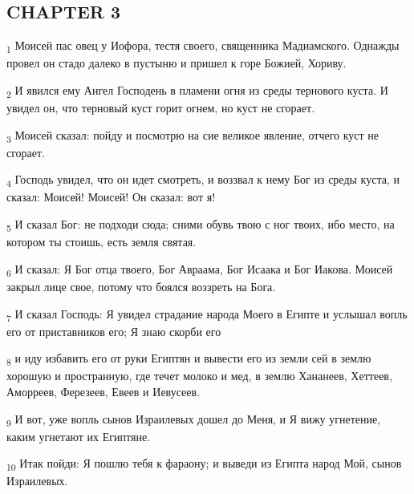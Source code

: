 \subsection{CHAPTER 3}
\begin{tcolorbox}
\textsubscript{1} Моисей пас овец у Иофора, тестя своего, священника Мадиамского. Однажды провел он стадо далеко в пустыню и пришел к горе Божией, Хориву.
\end{tcolorbox}
\begin{tcolorbox}
\textsubscript{2} И явился ему Ангел Господень в пламени огня из среды тернового куста. И увидел он, что терновый куст горит огнем, но куст не сгорает.
\end{tcolorbox}
\begin{tcolorbox}
\textsubscript{3} Моисей сказал: пойду и посмотрю на сие великое явление, отчего куст не сгорает.
\end{tcolorbox}
\begin{tcolorbox}
\textsubscript{4} Господь увидел, что он идет смотреть, и воззвал к нему Бог из среды куста, и сказал: Моисей! Моисей! Он сказал: вот я!
\end{tcolorbox}
\begin{tcolorbox}
\textsubscript{5} И сказал Бог: не подходи сюда; сними обувь твою с ног твоих, ибо место, на котором ты стоишь, есть земля святая.
\end{tcolorbox}
\begin{tcolorbox}
\textsubscript{6} И сказал: Я Бог отца твоего, Бог Авраама, Бог Исаака и Бог Иакова. Моисей закрыл лице свое, потому что боялся воззреть на Бога.
\end{tcolorbox}
\begin{tcolorbox}
\textsubscript{7} И сказал Господь: Я увидел страдание народа Моего в Египте и услышал вопль его от приставников его; Я знаю скорби его
\end{tcolorbox}
\begin{tcolorbox}
\textsubscript{8} и иду избавить его от руки Египтян и вывести его из земли сей в землю хорошую и пространную, где течет молоко и мед, в землю Хананеев, Хеттеев, Аморреев, Ферезеев, Евеев и Иевусеев.
\end{tcolorbox}
\begin{tcolorbox}
\textsubscript{9} И вот, уже вопль сынов Израилевых дошел до Меня, и Я вижу угнетение, каким угнетают их Египтяне.
\end{tcolorbox}
\begin{tcolorbox}
\textsubscript{10} Итак пойди: Я пошлю тебя к фараону; и выведи из Египта народ Мой, сынов Израилевых.
\end{tcolorbox}

